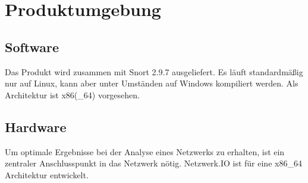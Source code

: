 \chapter{Produktumgebung}

\section{Software}
Das Produkt wird zusammen mit Snort 2.9.7 ausgeliefert. Es läuft standardmäßig nur auf Linux, kann aber unter Umständen auf Windows kompiliert werden. Als Architektur ist x86(\_64) vorgesehen.

\section{Hardware}
Um optimale Ergebnisse bei der Analyse eines Netzwerks zu erhalten, ist ein zentraler Anschlusspunkt in das Netzwerk nötig.
Netzwerk.IO ist für eine x86\_64 Architektur entwickelt.
